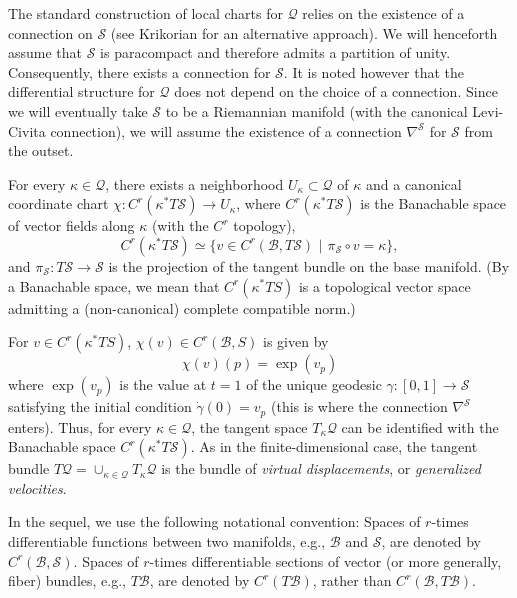 \documentclass[smallextended]{svjour3}
\begin{document}
The standard construction of local charts for ${\mathcal{Q}}$ relies on the existence of a connection on ${\mathcal{S}}$ (see Krikorian \cite{Kri72} for an alternative approach). We will henceforth assume that ${\mathcal{S}}$ is paracompact and therefore admits a partition of unity. Consequently, there exists a connection for ${\mathcal{S}}$. It is noted however that the differential structure for ${\mathcal{Q}}$ does not depend on the choice of a connection.  Since we will eventually take ${\mathcal{S}}$ to be a Riemannian manifold (with the canonical Levi-Civita connection), we will assume the existence of a connection $\nabla^{\mathcal{S}}$ for ${\mathcal{S}}$ from the outset.

For every $\kappa\in{\mathcal{Q}}$, there exists a neighborhood $U_\kappa \subset {\mathcal{Q}}$ of $\kappa$ and a canonical coordinate chart $\chi: C^r(\kappa^*T{\mathcal{S}})\to U_\kappa$, where $C^r(\kappa^*T{\mathcal{S}})$ is the Banachable space of  vector fields along $\kappa$ (with the $C^r$ topology), 
\[
C^r(\kappa^*T{\mathcal{S}}) \simeq \{v\in C^r({\mathcal{B}},T{\mathcal{S}})\,\,|\,\, \pi_{\mathcal{S}}\circ v=\kappa \},
\]
and $\pi_{\mathcal{S}}:T{\mathcal{S}}\to {\mathcal{S}}$ is the projection of the tangent bundle on the base manifold. 
(By a Banachable space, we mean that $C^r({\kappa^*TS})$ is a topological vector space admitting a (non-canonical) complete compatible norm.)

For $v\in C^r(\kappa^*TS)$, $\chi(v)\in C^r({\mathcal{B}},S)$ is given by 
\[
\chi(v)(p)=\exp(v_p)
\] 
where $\exp(v_p)$ is the value at $t=1$ of the unique geodesic $\gamma:[0,1]\to {\mathcal{S}}$ satisfying the initial condition $\dot{\gamma}(0)=v_p$ (this is where the connection $\nabla^{\mathcal{S}}$ enters). 
Thus, for every $\kappa\in {\mathcal{Q}}$, the tangent space  $T_\kappa {\mathcal{Q}}$ can be identified with the Banachable space    $C^r(\kappa^*T{\mathcal{S}})$. As in the finite-dimensional case, the tangent bundle $T{\mathcal{Q}}=\cup_{\kappa\in{\mathcal{Q}}}T_\kappa{\mathcal{Q}}$ is  the bundle of \emph{virtual displacements}, or \emph{generalized velocities}.

In the sequel, we use the following notational convention: Spaces of $r$-times differentiable functions between two manifolds, e.g., ${\mathcal{B}}$ and ${\mathcal{S}}$, are denoted by $C^r({\mathcal{B}},{\mathcal{S}})$. Spaces of $r$-times differentiable sections of vector (or more generally, fiber) bundles, e.g., $T{\mathcal{B}}$, are denoted by $C^r(T{\mathcal{B}})$, rather than $C^r({\mathcal{B}},T{\mathcal{B}})$.
\end{document}
